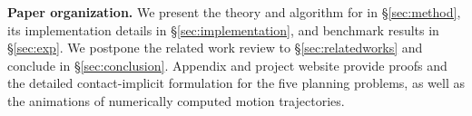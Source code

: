 

\textbf{Paper organization.} We present the theory and algorithm for \crisp in \S\ref{sec:method}, its implementation details in \S\ref{sec:implementation}, and benchmark results in \S\ref{sec:exp}. We postpone the related work review to \S\ref{sec:relatedworks} and conclude in \S\ref{sec:conclusion}. Appendix and project website provide proofs and the detailed contact-implicit formulation for the five planning problems, as well as the animations of numerically computed motion trajectories. 
